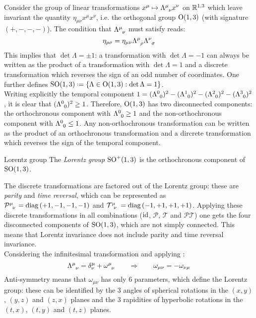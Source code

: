 Consider the group of linear transformations $ x^\mu \mapsto \tensor{\Lambda}{^\mu_\nu} x^\nu $ on $ \mathbb{R}^{1,3} $ which leave invariant the quantity $ \eta_{\mu \nu} x^\mu x^\nu $, i.e. the orthogonal group $ \mathrm{O}(1,3) $ (with signature $ (+,-,-,-) $). The condition that $ \tensor{\Lambda}{^\mu_\nu} $ must satisfy reads:
\begin{equation}
  \eta_{\rho \sigma} = \eta_{\mu \nu} \tensor{\Lambda}{^\mu_\rho} \tensor{\Lambda}{^\nu_\sigma}
  \label{eq:lor-def}
\end{equation}
This implies that $ \det \Lambda = \pm 1 $: a transformation with $ \det \Lambda = -1 $ can always be written as the product of a transformation with $ \det \Lambda = 1 $ and a discrete transformation which reverses the sign of an odd number of coordinates. One further defines $ \SOn{1,3} \defeq \{\Lambda \in \On{1,3} : \det \Lambda = 1\} $.\\
Writing explicitly the temporal component $ 1 = (\tensor{\Lambda}{^0_0})^2 - (\tensor{\Lambda}{^1_0})^2 - (\tensor{\Lambda}{^2_0})^2 - (\tensor{\Lambda}{^3_0})^2 $, it is clear that $ (\tensor{\Lambda}{^0_0})^2 \ge 1 $. Therefore, $ \mathrm{O}(1,3) $ has two disconnected components: the orthochronous component with $ \tensor{\Lambda}{^0_0} \ge 1 $ and the non-orthochronous component with $ \tensor{\Lambda}{^0_0} \le 1 $. Any non-orthochronous transformation can be written as the product of an orthochronous transformation and a dircrete transformation which reverses the sign of the temporal component.

\begin{definition}{Lorentz group}{}
  The \textit{Lorentz group} $ \mathrm{SO}^+(1,3) $ is the orthochronous component of $ \mathrm{SO}(1,3) $.
\end{definition}

The discrete transformations are factored out of the Lorentz group: these are \textit{parity} and \textit{time reversal}, which can be represented as $ \tensor{\mathcal{P}}{^\mu_\nu} = \diag \left( +1,-1,-1,-1 \right) $ and $ \tensor{\mathcal{T}}{^\mu_\nu} = \diag \left( -1,+1,+1,+1 \right) $. Applying these discrete transformations in all combinations ($ \operatorname{id} $, $ \mathcal{P} $, $ \mathcal{T} $ and $ \mathcal{P} \mathcal{T} $) one gets the four disconnected components of $ \mathrm{SO}(1,3) $, which are not simply connected. This means that Lorentz invariance does not include parity and time reversal invariance.\\
Considering the infinitesimal transformation and applying :
\begin{equation*}
  \tensor{\Lambda}{^\mu_\nu} = \delta^\mu_\nu + \tensor{\omega}{^\mu_\nu}
  \qquad \Rightarrow \qquad
  \omega_{\mu \nu} = - \omega_{\nu \mu}
\end{equation*}
Anti-symmetry means that $ \omega_{\mu \nu} $ has only 6 parameters, which define the Lorentz group: these can be identified by the 3 angles of spherical rotations in the $ (x,y) $, $ (y,z) $ and $ (z,x) $ planes and the 3 rapidities of hyperbolic rotations in the $ (t,x) $, $ (t,y) $ and $ (t,z) $ planes.


